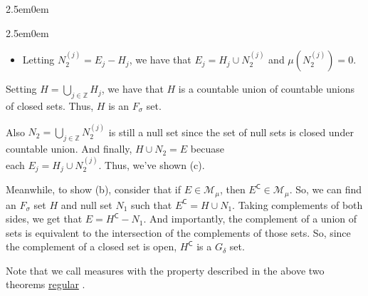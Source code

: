 \documentclass{book}
\newenvironment{myIndent}{%
   \begin{adjustwidth}{2.5em}{0em}%
}{%
   \end{adjustwidth}%
}
\newcommand{\udefine}[1]{{%
   \setulcolor{Red}%
   \setul{0.14em}{0.07em}%
   \ul{#1}%
}}
\newcommand{\comp}{\mathsf{C}}
\newcommand{\retTwo}{\hfill\bigbreak}
\begin{document}
\begin{myIndent}
\begin{itemize}
\begin{myIndent}
         \begin{itemize}
            \item[\bullet] Letting $N_2^{(j)} = E_j - H_j$, we have that $E_j = H_j \cup N_2^{(j)}$ and $\mu(N_2^{(j)}) = 0$.\retTwo
         \end{itemize}

         Setting $H = \bigcup\limits_{j \in \mathbb{Z}} H_j$, we have that $H$ is a countable union of countable unions of closed sets. Thus, $H$ is an $F_\sigma$ set.\retTwo
         
         Also $N_2 = \bigcup\limits_{j \in \mathbb{Z}}N_2^{(j)}$ is still a null set since the set of null sets is closed under\\ [-8pt] \phantom{aaaaaaaaaaaaaaaa} countable union. And finally, $H \cup N_2 = E$ becuase\\ \phantom{aaaaaaaaaaaaaaaa} each $E_j = H_j \cup N_2^{(j)}$. Thus, we've shown (c).\newpage

         Meanwhile, to show (b), consider that if $E \in \mathcal{M}_\mu$, then $E^\comp \in \mathcal{M}_\mu$. So, we can find an $F_\sigma$ set $H$ and null set $N_1$ such that $E^\comp = H \cup N_1$. Taking complements of both sides, we get that $E = H^\comp - N_1$. And importantly, the complement of a union of sets is equivalent to the intersection of the complements of those sets. So, since the complement of a closed set is open,  $H^\comp$ is a $G_\delta$ set.\retTwo
      \end{myIndent}
   \end{itemize}
\end{myIndent}

Note that we call measures with the property described in the above two theorems \udefine{regular}.\retTwo
\end{document}
